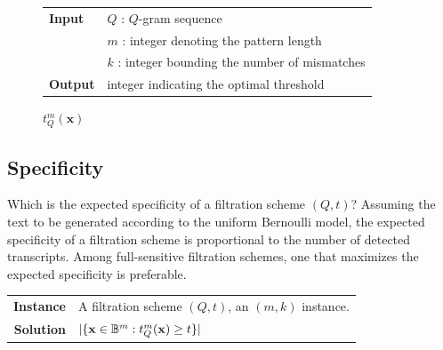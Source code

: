\begin{figure}[b]
\begin{center}
\begin{minipage}[t]{.8\textwidth}
\begin{algorithm}[H]
\begin{tabular}{ll}
\textbf{Input}  & $Q$ : $Q$-gram sequence\\
				& $m$ : integer denoting the pattern length\\
				& $k$ : integer bounding the number of mismatches\\
\textbf{Output} & integer indicating the optimal threshold\\
\end{tabular}
\begin{algorithmic}[1]
\EndWhile
\State \Return $t^m_Q(\mathbf{x})$
\end{algorithmic}
\label{alg:qgram-threshold-apx}
\end{algorithm}
\end{minipage}
\end{center}
\end{figure}


\subsection{Specificity}
\label{sub:qgram-specificity}

Which is the expected specificity of a filtration scheme $(Q,t)$?
Assuming the text to be generated according to the uniform Bernoulli model, the expected specificity of a filtration scheme is proportional to the number of detected transcripts.
Among full-sensitive filtration schemes, one that maximizes the expected specificity is preferable.

\begin{problem}
\begin{tabular}{rl}
{\bf Instance}	&	A filtration scheme $(Q,t)$, an $(m,k)$ instance.\\
{\bf Solution}	&	$| \{ \mathbf{x} \in \mathbb {B}^{m} : t_{Q}^{m}(\mathbf{x}) \geq t \} |$
\end{tabular}
\end{problem}

